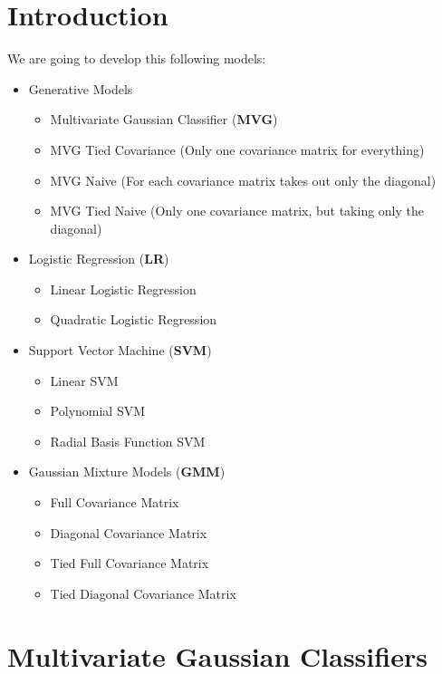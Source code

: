 \documentclass[english]{report}
\begin{document}
\section{Introduction}
We are going to develop this following models:
\begin{itemize}
    \item Generative Models
    \begin{itemize}
        \item Multivariate Gaussian Classifier (\textbf{MVG})
        \item MVG Tied Covariance (Only one covariance matrix for everything)
        \item MVG Naive (For each covariance matrix takes out only the diagonal)
        \item MVG Tied Naive (Only one covariance matrix, but taking only the diagonal)
    \end{itemize}
    \item Logistic Regression (\textbf{LR})
    \begin{itemize}
        \item Linear Logistic Regression
        \item Quadratic Logistic Regression
    \end{itemize}
    \item Support Vector Machine (\textbf{SVM})
    \begin{itemize}
        \item Linear SVM
        \item Polynomial SVM
        \item Radial Basis Function SVM
    \end{itemize}
    \item Gaussian Mixture Models (\textbf{GMM})
    \begin{itemize}
        \item Full Covariance Matrix
        \item Diagonal Covariance Matrix
        \item Tied Full Covariance Matrix
        \item Tied Diagonal Covariance Matrix
    \end{itemize}
\end{itemize}

\clearpage

\section{Multivariate Gaussian Classifiers}
\end{document}
